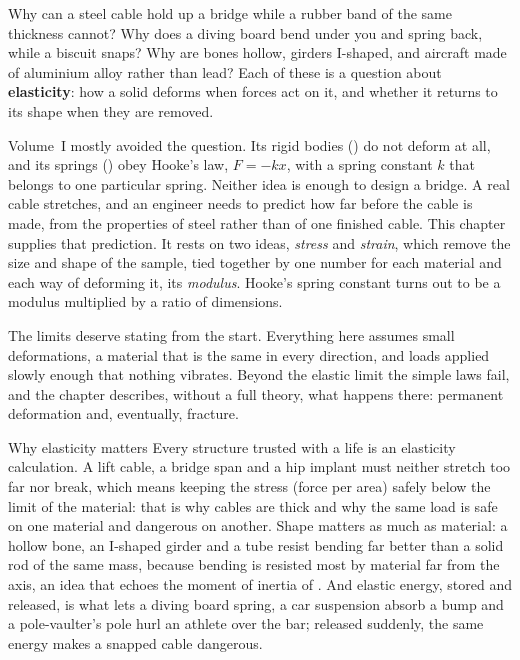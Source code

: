 
Why can a steel cable hold up a bridge while a rubber band of the same thickness cannot? Why does a
diving board bend under you and spring back, while a biscuit snaps? Why are bones hollow, girders
I-shaped, and aircraft made of aluminium alloy rather than lead? Each of these is a question about
\textbf{elasticity}: how a solid deforms when forces act on it, and whether it returns to its shape when
they are removed.

Volume~I mostly avoided the question. Its rigid bodies () do not deform at all, and
its springs () obey Hooke's law, $F=-kx$, with a spring constant $k$ that belongs to
one particular spring. Neither idea is enough to design a bridge. A real cable stretches, and an engineer
needs to predict how far before the cable is made, from the properties of steel rather than of one
finished cable. This chapter supplies that prediction. It rests on two ideas, \emph{stress} and
\emph{strain}, which remove the size and shape of the sample, tied together by one number for each
material and each way of deforming it, its \emph{modulus}. Hooke's spring constant turns out to be a
modulus multiplied by a ratio of dimensions.

The limits deserve stating from the start. Everything here assumes small deformations, a material that
is the same in every direction, and loads applied slowly enough that nothing vibrates. Beyond the
elastic limit the simple laws fail, and the chapter describes, without a full theory, what happens
there: permanent deformation and, eventually, fracture.

\begin{motivbox}{Why elasticity matters}
Every structure trusted with a life is an elasticity calculation. A lift cable, a bridge span and a hip
implant must neither stretch too far nor break, which means keeping the stress (force per area) safely
below the limit of the material: that is why cables are thick and why the same load is safe on one
material and dangerous on another. Shape matters as much as material: a hollow bone, an I-shaped girder
and a tube resist bending far better than a solid rod of the same mass, because bending is resisted most
by material far from the axis, an idea that echoes the moment of inertia of . And
elastic energy, stored and released, is what lets a diving board spring, a car suspension absorb a bump
and a pole-vaulter's pole hurl an athlete over the bar; released suddenly, the same energy makes a
snapped cable dangerous.
\end{motivbox}

